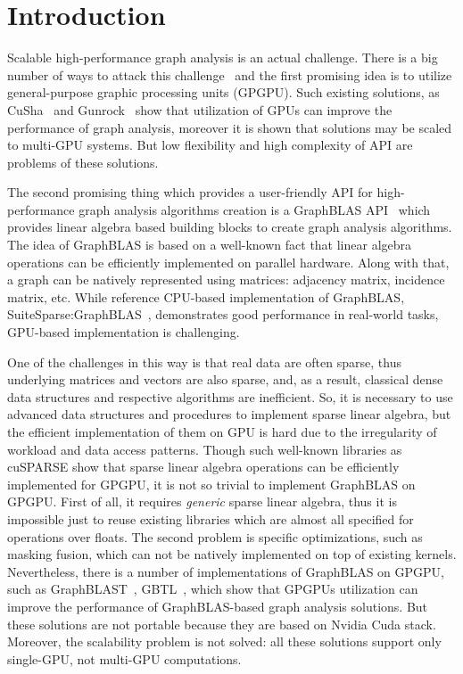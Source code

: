 \section{Introduction}

Scalable high-performance graph analysis is an actual challenge.
There is a big number of ways to attack this challenge~\cite{Coimbra2021} and the first promising idea is to utilize general-purpose graphic processing units (GPGPU).
Such existing solutions, as CuSha~\cite{10.1145/2600212.2600227} and Gunrock~\cite{7967137} show that utilization of GPUs can improve the performance of graph analysis, moreover it is shown that solutions may be scaled to multi-GPU systems.
But low flexibility and high complexity of API are problems of these solutions.

The second promising thing which provides a user-friendly API for high-performance graph analysis algorithms creation is a GraphBLAS API~\cite{7761646} which provides linear algebra based building blocks to create graph analysis algorithms.
The idea of GraphBLAS is based on a well-known fact that linear algebra operations can be efficiently implemented on parallel hardware.
Along with that, a graph can be natively represented using matrices: adjacency matrix, incidence matrix, etc.
While reference CPU-based implementation of GraphBLAS, SuiteSparse:GraphBLAS~\cite{10.1145/3322125}, demonstrates good performance in real-world tasks, GPU-based implementation is challenging.

One of the challenges in this way is that real data are often sparse, thus underlying matrices and vectors are also sparse, and, as a result, classical dense data structures and respective algorithms are inefficient. 
So, it is necessary to use advanced data structures and procedures to implement sparse linear algebra, but the efficient implementation of them on GPU is hard due to the irregularity of workload and data access patterns.
Though such well-known libraries as cuSPARSE show that sparse linear algebra operations can be efficiently implemented for GPGPU, it is not so trivial to implement GraphBLAS on GPGPU. 
First of all, it requires \textit{generic} sparse linear algebra, thus it is impossible just to reuse existing libraries which are almost all specified for operations over floats.
The second problem is specific optimizations, such as masking fusion, which can not be natively implemented on top of existing kernels.
Nevertheless, there is a number of implementations of GraphBLAS on GPGPU, such as GraphBLAST~\cite{yang2019graphblast}, GBTL~\cite{7529957}, which show that GPGPUs utilization can improve the performance of GraphBLAS-based graph analysis solutions.
But these solutions are not portable because they are based on Nvidia Cuda stack.
Moreover, the scalability problem is not solved: all these solutions support only single-GPU, not multi-GPU computations.

